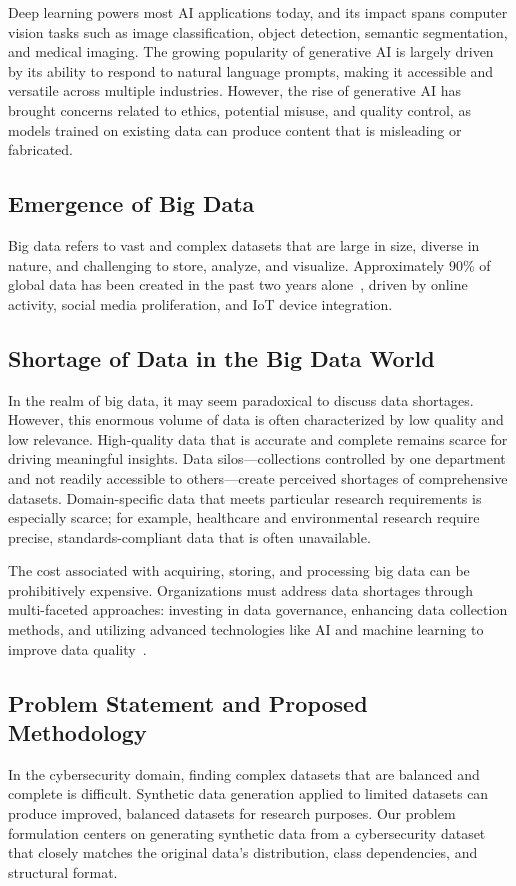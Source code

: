 \documentclass[conference]{IEEEtran}
\begin{document}
Deep learning powers most AI applications today, and its impact spans computer vision tasks such as image classification, object detection, semantic segmentation, and medical imaging. The growing popularity of generative AI is largely driven by its ability to respond to natural language prompts, making it accessible and versatile across multiple industries. However, the rise of generative AI has brought concerns related to ethics, potential misuse, and quality control, as models trained on existing data can produce content that is misleading or fabricated.

\subsection{Emergence of Big Data}
Big data refers to vast and complex datasets that are large in size, diverse in nature, and challenging to store, analyze, and visualize. Approximately 90\% of global data has been created in the past two years alone~\cite{bigdata}, driven by online activity, social media proliferation, and IoT device integration.

\subsection{Shortage of Data in the Big Data World}
In the realm of big data, it may seem paradoxical to discuss data shortages. However, this enormous volume of data is often characterized by low quality and low relevance. High-quality data that is accurate and complete remains scarce for driving meaningful insights. Data silos---collections controlled by one department and not readily accessible to others---create perceived shortages of comprehensive datasets. Domain-specific data that meets particular research requirements is especially scarce; for example, healthcare and environmental research require precise, standards-compliant data that is often unavailable.

The cost associated with acquiring, storing, and processing big data can be prohibitively expensive. Organizations must address data shortages through multi-faceted approaches: investing in data governance, enhancing data collection methods, and utilizing advanced technologies like AI and machine learning to improve data quality~\cite{bigdataanalytics}.

\subsection{Problem Statement and Proposed Methodology}
In the cybersecurity domain, finding complex datasets that are balanced and complete is difficult. Synthetic data generation applied to limited datasets can produce improved, balanced datasets for research purposes. Our problem formulation centers on generating synthetic data from a cybersecurity dataset that closely matches the original data's distribution, class dependencies, and structural format.
\end{document}
